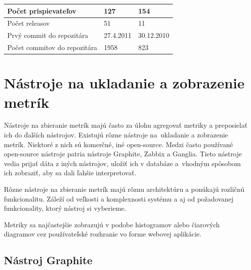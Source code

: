 \documentclass[a4paper, upjsfrontpage, thesismargins, thesislinespacing]{rnthesis}
\begin{document}
\begin{table}
\begin{tabular}{| p{3.7cm} | p{4.5cm} | p{4.7cm} |}
		Počet prispievateľov & 127 & 154 \\ \hline

		Počet releasov & 51 & 11 \\ \hline

		Prvý commit do repozitára & 27.4.2011 & 30.12.2010 \\ \hline
		
		Počet commitov do repozitára & 1958 & 823 \\ \hline

	\end{tabular}
\end{table}

\newpage


\chapter{Nástroje na ukladanie a zobrazenie metrík}

Nástroje na zbieranie metrík majú často za úlohu agregovať metriky a preposielať ich do ďalších nástrojov.
Existujú rôzne nástroje na~ukladanie a zobrazenie metrík.
Niektoré z nich sú komerčné, iné open-source.
Medzi často používané open-source nástroje patria nástroje Graphite, Zabbix a Ganglia.
Tieto nástroje vedia prijať dáta z iných nástrojov, uložiť ich v databáze a~vhodným spôsobom ich zobraziť, aby sa dali ľahšie interpretovať.

Rôzne nástroje na zbieranie metrík majú rôznu architektúru a ponúkajú rozličnú funkcionalitu.
Záleží od veľkosti a komplexnosti systému a aj od požadovanej funkcionality, ktorý nástroj si vyberieme.

Metriky sa najčastejšie zobrazujú v podobe histogramov alebo čiarových diagramov cez používateľské rozhranie vo forme webovej aplikácie.

\section{Nástroj Graphite}
\end{document}
